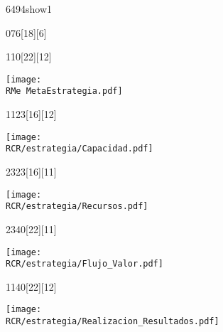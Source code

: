 \begin{NuevaPagina}{64}{94}{show1}
	\CabeceraDePoster{\MATERIA} 
	\begin{NuevoParrafo}{0}{76}[18][6]
		\begin{Marco}[\LineaSupC][\LineaInfC][\LineaIzqC][\LineaDerC][CBlanco]
		\end{Marco}
	\end{NuevoParrafo} 
	\CiudadFechaVolumen
	
	\begin{NuevoParrafo}{11}{0}[22][12]
		\begin{Marco}[\LineaSupC][\LineaInfC][\LineaIzqC][\LineaDerC][CBlanco]
			\centering\texttt{[image: \\RMe MetaEstrategia.pdf]}		
		\end{Marco}
	\end{NuevoParrafo}	
	\begin{NuevoParrafo}{11}{23}[16][12]
		\begin{Marco}[\LineaSupC][\LineaInfC][\LineaIzqC][\LineaDerC][CBlanco]
			\subseccionC{\PVMaC}%
			\centering\texttt{[image: \\RCR/estrategia/Capacidad.pdf]}		
		\end{Marco}
	\end{NuevoParrafo}	
	\begin{NuevoParrafo}{23}{23}[16][11]
		\begin{Marco}[\LineaSupC][\LineaInfC][\LineaIzqC][\LineaDerC][CBlanco]
			\subseccionC{\PVMaR}%
			\centering\texttt{[image: \\RCR/estrategia/Recursos.pdf]}		
		\end{Marco}
	\end{NuevoParrafo}	
		\begin{NuevoParrafo}{23}{40}[22][11]
		\begin{Marco}[\LineaSupC][\LineaInfC][\LineaIzqC][\LineaDerC][CBlanco]
			\subseccionC{\PVFdV}%
			\centering\texttt{[image: \\RCR/estrategia/Flujo\_Valor.pdf]}		
		\end{Marco}
	\end{NuevoParrafo}	
	\begin{NuevoParrafo}{11}{40}[22][12]
		\begin{Marco}[\LineaSupC][\LineaInfC][\LineaIzqC][\LineaDerC][CBlanco]
			\subseccionC{\PVRes}%
			\centering\texttt{[image: \\RCR/estrategia/Realizacion\_Resultados.pdf]}		
		\end{Marco}
	\end{NuevoParrafo}	


\end{NuevaPagina}
